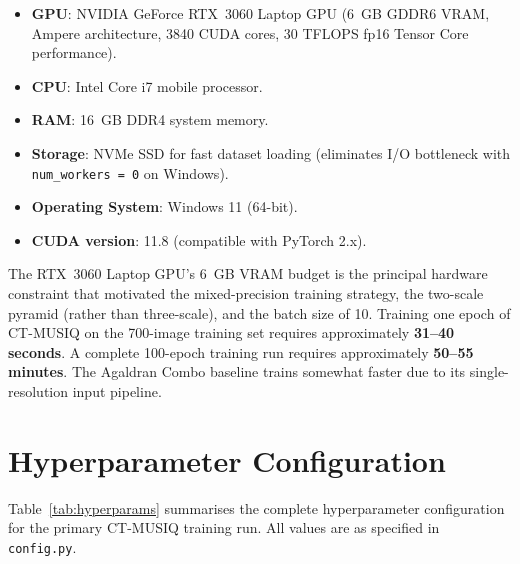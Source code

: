 \begin{itemize}
    \item \textbf{GPU}: NVIDIA GeForce RTX~3060 Laptop GPU (6~GB GDDR6 VRAM, Ampere
          architecture, 3840 CUDA cores, 30 TFLOPS fp16 Tensor Core performance).
    \item \textbf{CPU}: Intel Core i7 mobile processor.
    \item \textbf{RAM}: 16~GB DDR4 system memory.
    \item \textbf{Storage}: NVMe SSD for fast dataset loading (eliminates I/O bottleneck
          with \texttt{num\_workers = 0} on Windows).
    \item \textbf{Operating System}: Windows 11 (64-bit).
    \item \textbf{CUDA version}: 11.8 (compatible with PyTorch 2.x).
\end{itemize}

The RTX~3060 Laptop GPU's 6~GB VRAM budget is the principal hardware constraint that
motivated the mixed-precision training strategy, the two-scale pyramid (rather than
three-scale), and the batch size of 10. Training one epoch of CT-MUSIQ on the 700-image
training set requires approximately \textbf{31--40 seconds}. A complete 100-epoch
training run requires approximately \textbf{50--55 minutes}. The Agaldran Combo baseline
trains somewhat faster due to its single-resolution input pipeline.


\section{Hyperparameter Configuration}
\label{sec:exp_hyperparams}

Table~\ref{tab:hyperparams} summarises the complete hyperparameter configuration for
the primary CT-MUSIQ training run. All values are as specified in \texttt{config.py}.

